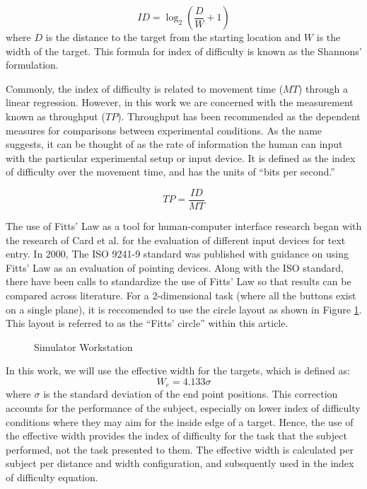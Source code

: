 \begin{equation}
    {ID}=\log_2\left(\frac{D}{W}+1\right)
    \label{index_of_difficulty}
\end{equation}
where $D$ is the distance to the target from the starting location and $W$ is the width of the target.
This formula for index of difficulty is known as the Shannons' formulation\cite{mackenzie_note_1989}.

Commonly, the index of difficulty is related to movement time (${MT}$) through a linear regression.
However, in this work we are concerned with the measurement known as throughput (${TP}$).
Throughput has been recommended as the dependent measures for comparisons between experimental conditions.
As the name suggests, it can be thought of as the rate of information the human can input with the particular experimental setup or input device.
It is defined as the index of difficulty over the movement time, and has the units of ``bits per second.''

\begin{equation}
    {TP}=\frac{ID}{MT}
\end{equation}

The use of Fitts' Law as a tool for human-computer interface research began with the research of Card et al.\cite{card_evaluation_1978} for the evaluation of different input devices for text entry.
In 2000, The ISO 9241-9 standard was published with guidance on using Fitts' Law as an evaluation of pointing devices\cite{international_organization_for_standardization_iso_2000}.
Along with the ISO standard, there have been calls to standardize the use of Fitts' Law so that results can be compared across literature\cite{soukoreff_towards_2001}.
For a 2-dimensional task (where all the buttons exist on a single plane), it is reccomended to use the circle layout as shown in Figure \ref{fig:ph_fitts_circle}.
This layout is referred to as the ``Fitts' circle'' within this article.

\begin{figure}
    \centering
    \caption{Simulator Workstation}
    \label{fig:ph_fitts_circle}
\end{figure}

In this work, we will use the effective width for the targets, which is defined as:
\begin{equation}
    W_e = 4.133\sigma
\end{equation}
where $\sigma$ is the standard deviation of the end point positions.
This correction accounts for the performance of the subject, especially on lower index of difficulty conditions where they may aim for the inside edge of a target.
Hence, the use of the effective width provides the index of difficulty for the task that the subject performed, not the task presented to them.
The effective width is calculated per subject per distance and width configuration, and subsquently used in the index of difficulty equation.

